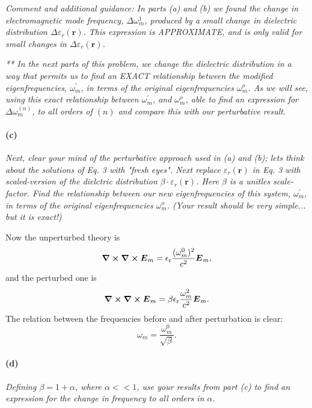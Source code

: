 \documentclass[hyperref, a4paper]{article}
\newcommand{\epsr}{\epsilon_{\text{r}}}
\begin{document}
\textit{Comment and additional guidance: In parts (a) and (b) we found the change in electromagnetic mode frequency, $\Delta \omega_m^1$, produced by a small change in dielectric distribution $\Delta \varepsilon_r(\mathbf{r})$. This expression is APPROXIMATE, and is only valid for small changes in $\Delta \varepsilon_r(\mathbf{r})$.}

\textit{** In the next parts of this problem, we change the dielectric distribution in a way that permits us to find an EXACT relationship between the modified eigenfrequencies, $\omega_m^{\prime}$, in terms of the original eigenfrequencies $\omega_m^o$. As we will see, using this exact relationship between $\omega_m^{\prime}$, and $\omega_m^o$, able to find an expression for $\Delta \omega_m^{(n)}$, to all orders of $(n)$ and compare this with our perturbative result.}

\paragraph*{(c)} \textit{Next, clear your mind of the perturbative approach used in (a) and (b); lets think about the solutions of Eq. 3 with "fresh eyes". Next replace $\varepsilon_r(\mathbf{r})$ in Eq. 3 with scaled-version of the dielctric distribution $\beta \cdot \varepsilon_r(\mathbf{r})$. Here $\beta$ is a unitles scale-factor. Find the relationship between our new eigenfrequencies of this system, $\omega_m^{\prime}$, in terms of the original eigenfrequencies $\omega_m^o$. (Your result should be very simple... but it is exact!)}

Now the unperturbed theory is 
\begin{equation}
    \curl{\curl{\vb*{E}_m}} = \epsr \frac{(\omega_m^0)^2}{c^2} \vb*{E}_m, 
\end{equation}
and the perturbed one is 
\begin{equation}
    \curl{\curl{\vb*{E}_m}} = \beta \epsr \frac{\omega_m^2}{c^2} \vb*{E}_m.
\end{equation}
The relation between the frequencies before and after perturbation is clear: 
\begin{equation}
    \omega_m = \frac{\omega_m^0}{\sqrt{\beta}}.
\end{equation}

\paragraph*{(d)} \textit{
    Defining $\beta=1+\alpha$, where $\alpha<<1$, use your results from part (c) to find an expression for the change in frequency to all orders in $\alpha$.
}
\end{document}
